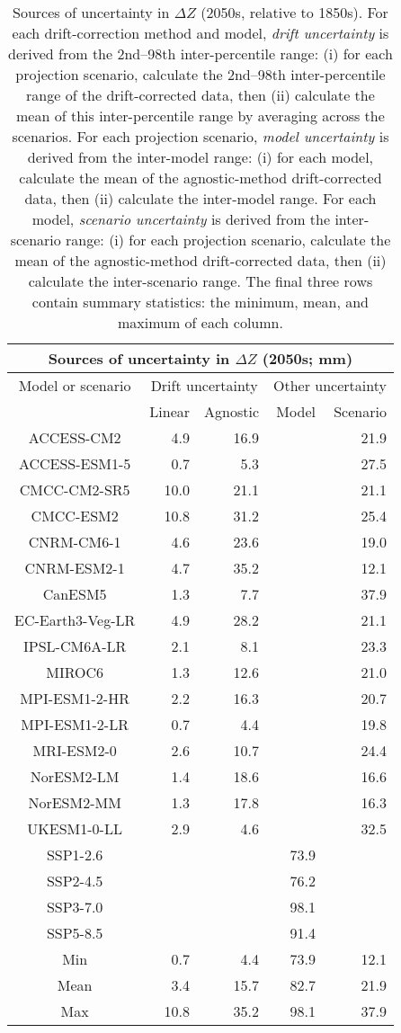 \begin{table*}[t]
\centering
\caption{Sources of uncertainty in $\Delta Z$ (2050s, relative to 1850s). For each drift-correction method and model, \emph{drift uncertainty} is derived from the 2nd--98th inter-percentile range: (i) for each projection scenario, calculate the 2nd--98th inter-percentile range of the drift-corrected data, then (ii) calculate the mean of this inter-percentile range by averaging across the scenarios. For each projection scenario, \emph{model uncertainty} is derived from the inter-model range: (i) for each model, calculate the mean of the agnostic-method drift-corrected data, then (ii) calculate the inter-model range. For each model, \emph{scenario uncertainty} is derived from the inter-scenario range: (i) for each projection scenario, calculate the mean of the agnostic-method drift-corrected data, then (ii) calculate the inter-scenario range. The final three rows contain summary statistics: the minimum, mean, and maximum of each column.}
\begin{tabular}{c|rr|rr}
\toprule
\multicolumn{5}{c}{Sources of uncertainty in $\Delta Z$ (2050s; mm)} \\ 
\midrule
Model or scenario & \multicolumn{2}{c|}{Drift uncertainty} & \multicolumn{2}{c}{Other uncertainty} \\
 & Linear & Agnostic & Model & Scenario \\
\midrule
ACCESS-CM2 & 4.9 & 16.9 &  & 21.9 \\
ACCESS-ESM1-5 & 0.7 & 5.3 &  & 27.5 \\
CMCC-CM2-SR5 & 10.0 & 21.1 &  & 21.1 \\
CMCC-ESM2 & 10.8 & 31.2 &  & 25.4 \\
CNRM-CM6-1 & 4.6 & 23.6 &  & 19.0 \\
CNRM-ESM2-1 & 4.7 & 35.2 &  & 12.1 \\
CanESM5 & 1.3 & 7.7 &  & 37.9 \\
EC-Earth3-Veg-LR & 4.9 & 28.2 &  & 21.1 \\
IPSL-CM6A-LR & 2.1 & 8.1 &  & 23.3 \\
MIROC6 & 1.3 & 12.6 &  & 21.0 \\
MPI-ESM1-2-HR & 2.2 & 16.3 &  & 20.7 \\
MPI-ESM1-2-LR & 0.7 & 4.4 &  & 19.8 \\
MRI-ESM2-0 & 2.6 & 10.7 &  & 24.4 \\
NorESM2-LM & 1.4 & 18.6 &  & 16.6 \\
NorESM2-MM & 1.3 & 17.8 &  & 16.3 \\
UKESM1-0-LL & 2.9 & 4.6 &  & 32.5 \\
SSP1-2.6 &  &  & 73.9 &  \\
SSP2-4.5 &  &  & 76.2 &  \\
SSP3-7.0 &  &  & 98.1 &  \\
SSP5-8.5 &  &  & 91.4 &  \\
\midrule
Min & 0.7 & 4.4 & 73.9 & 12.1 \\
Mean & 3.4 & 15.7 & 82.7 & 21.9 \\
Max & 10.8 & 35.2 & 98.1 & 37.9 \\
\bottomrule
\end{tabular}
\end{table*}
